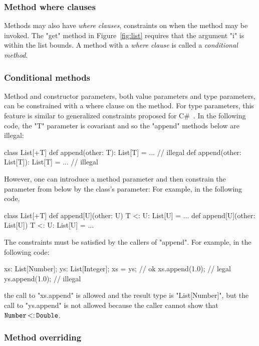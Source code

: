 \documentclass[preprint,nocopyrightspace,9pt]{sigplanconf}
\begin{document}
\subsubsection{Method where clauses}

Methods may also have \emph{where clauses}, constraints on when
the method may be invoked.  The \xcd"get" method in
Figure~\ref{fig:list} requires that the argument \xcd"i" is
within the list bounds.  A method with a \emph{where clause}
is called a \emph{conditional method}.

\subsubsection{Conditional methods}

Method and constructor parameters, both value parameters and
type parameters,
can be constrained with a where clause on the method.
For type parameters,
this feature is similar to generalized constraints proposed for
C\#~\cite{emir06}.
%
In the following code, the \xcd"T" parameter is covariant
and so the \xcd"append" methods below are illegal:
\begin{xten}
class List[+T] {
   def append(other: T): List[T] = { ... }
        // illegal
   def append(other: List[T]): List[T] = { ... }
        // illegal
}
\end{xten}
%
However, one can introduce a method parameter and then constrain
the parameter from below by the class's parameter:
For example, in the following code,
\begin{xten}
class List[+T] {
   def append[U](other: U)
        {T <: U}: List[U] = { ... }
   def append[U](other: List[U])
        {T <: U}: List[U] = { ... }
}
\end{xten}

The constraints must be satisfied by the callers of \xcd"append".
For example, in the following code:
\begin{xten}
xs: List[Number];
ys: List[Integer];
xs = ys; // ok
xs.append(1.0); // legal
ys.append(1.0); // illegal
\end{xten}
the call to \xcd"xs.append" is allowed and the result type is \xcd"List[Number]", but
the call to \xcd"ys.append" is not allowed because the caller cannot show that
${\tt Number} \subtype {\tt Double}$.

\subsubsection{Method overriding}
\end{document}
